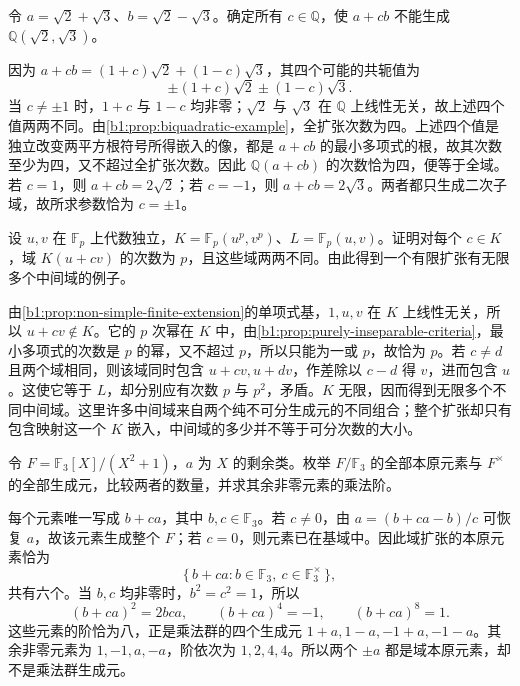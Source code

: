 \begin{exercise}\label{b1:ex:16-10}
	令 \(a=\sqrt2+\sqrt3\)、\(b=\sqrt2-\sqrt3\)。确定所有 \(c\in\mathbb Q\)，使 \(a+cb\) 不能生成 \(\mathbb Q(\sqrt2,\sqrt3)\)。
\end{exercise}
\begin{solution}
	因为 \(a+cb=(1+c)\sqrt2+(1-c)\sqrt3\)，其四个可能的共轭值为
	\[
		\pm(1+c)\sqrt2\pm(1-c)\sqrt3.
	\]
	当 \(c\neq\pm1\) 时，\(1+c\) 与 \(1-c\) 均非零；\(\sqrt2\) 与 \(\sqrt3\) 在 \(\mathbb Q\) 上线性无关，故上述四个值两两不同。由\cref{b1:prop:biquadratic-example}，全扩张次数为四。上述四个值是独立改变两平方根符号所得嵌入的像，都是 \(a+cb\) 的最小多项式的根，故其次数至少为四，又不超过全扩张次数。因此 \(\mathbb Q(a+cb)\) 的次数恰为四，便等于全域。若 \(c=1\)，则 \(a+cb=2\sqrt2\)；若 \(c=-1\)，则 \(a+cb=2\sqrt3\)。两者都只生成二次子域，故所求参数恰为 \(c=\pm1\)。
\end{solution}

\begin{exercise}\label{b1:ex:16-11}
	设 \(u,v\) 在 \(\mathbb F_p\) 上代数独立，\(K=\mathbb F_p(u^p,v^p)\)、\(L=\mathbb F_p(u,v)\)。证明对每个 \(c\in K\)，域 \(K(u+cv)\) 的次数为 \(p\)，且这些域两两不同。由此得到一个有限扩张有无限多个中间域的例子。
\end{exercise}
\begin{solution}
	由\cref{b1:prop:non-simple-finite-extension}的单项式基，\(1,u,v\) 在 \(K\) 上线性无关，所以 \(u+cv\notin K\)。它的 \(p\) 次幂在 \(K\) 中，由\cref{b1:prop:purely-inseparable-criteria}，最小多项式的次数是 \(p\) 的幂，又不超过 \(p\)，所以只能为一或 \(p\)，故恰为 \(p\)。若 \(c\neq d\) 且两个域相同，则该域同时包含 \(u+cv,u+dv\)，作差除以 \(c-d\) 得 \(v\)，进而包含 \(u\)。这使它等于 \(L\)，却分别应有次数 \(p\) 与 \(p^2\)，矛盾。\(K\) 无限，因而得到无限多个不同中间域。这里许多中间域来自两个纯不可分生成元的不同组合；整个扩张却只有包含映射这一个 \(K\) 嵌入，中间域的多少并不等于可分次数的大小。
\end{solution}

\begin{exercise}\label{b1:ex:16-12}
	令 \(F=\mathbb F_3[X]/(X^2+1)\)，\(a\) 为 \(X\) 的剩余类。枚举 \(F/\mathbb F_3\) 的全部本原元素与 \(F^\times\) 的全部生成元，比较两者的数量，并求其余非零元素的乘法阶。
\end{exercise}
\begin{solution}
	每个元素唯一写成 \(b+ca\)，其中 \(b,c\in\mathbb F_3\)。若 \(c\ne0\)，由 \(a=(b+ca-b)/c\) 可恢复 \(a\)，故该元素生成整个 \(F\)；若 \(c=0\)，则元素已在基域中。因此域扩张的本原元素恰为
	\[
		\{\,b+ca:b\in\mathbb F_3,\ c\in\mathbb F_3^\times\,\},
	\]
	共有六个。当 \(b,c\) 均非零时，\(b^2=c^2=1\)，所以
	\[
		(b+ca)^2=2bca,\qquad (b+ca)^4=-1,\qquad(b+ca)^8=1.
	\]
	这些元素的阶恰为八，正是乘法群的四个生成元 \(1+a,1-a,-1+a,-1-a\)。其余非零元素为 \(1,-1,a,-a\)，阶依次为 \(1,2,4,4\)。所以两个 \(\pm a\) 都是域本原元素，却不是乘法群生成元。
\end{solution}

